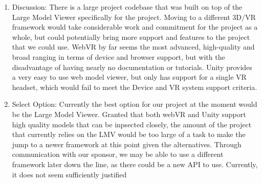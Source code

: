 \documentclass[letterpaper, 10pt, draftclsnofoot, compsoc, onecolumn]{IEEEtran}
\begin{document}
\begin{enumerate}
			\item{Discussion:}
			There is a large project codebase that was built on top of the Large Model Viewer specifically for the project. Moving to a different 3D/VR framework would take considerable work and commitment for the project as a whole, but could potentially bring more support and features to the project that we could use. WebVR by far seems the most advanced, high-quality and broad ranging in terms of device and browser support, but with the disadvantage of having nearly no documentation or tutorials. Unity provides a very easy to use web model viewer, but only has support for a single VR headset, which would fail to meet the Device and VR system support criteria. 
			\item{Select Option:}
			Currently the best option for our project at the moment would be the Large Model Viewer. Granted that both webVR and Unity support high quality models that can be inpsected closely, the amount of the project that currently relies on the LMV would be too large of a task to make the jump to a newer framework at this point given the alternatives. Through communication with our sponsor, we may be able to use a different framework later down the line, as there could be a new API to use. Currently, it does not seem sufficiently justified 
	\end{enumerate}
		
\end{document}
